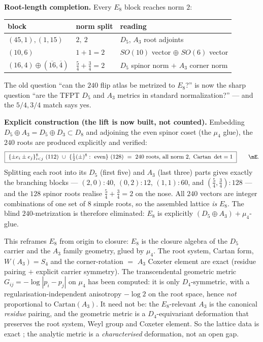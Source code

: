 \noindent\textbf{Root-length completion.} Every $E_8$ block reaches norm $2$:
\begin{center}\small
\begin{tabularx}{\linewidth}{@{}llY@{}}
\toprule
block & norm split & reading \\
\midrule
$(45,1),(1,15)$ & $2,\ 2$ & $D_5$, $A_3$ root adjoints \\
$(10,6)$ & $1+1=2$ & $SO(10)$ vector $\oplus$ $SO(6)$ vector \\
$(16,4)\oplus(\overline{16},\overline4)$ & $\tfrac54+\tfrac34=2$ & $D_5$ spinor norm $+$ $A_3$ corner norm \\
\bottomrule
\end{tabularx}
\end{center}
The old question ``can the $240$ flip atlas be metrized to $E_8$?'' is now the sharp question ``are
the TFPT $D_5$ and $A_3$ metrics in standard normalization?'' --- and the $5/4,3/4$ match says yes.

\noindent\textbf{Explicit construction (the lift is now built, not counted).} Embedding
$D_5\oplus A_3=D_5\oplus D_3\subset D_8$ and adjoining the even spinor coset (the $\mu_4$ glue), the
$240$ roots are produced explicitly and verified:
\begin{equation}
  \boxed{\ \{\pm e_i\pm e_j\}_{i<j}^{8}\ (112)\ \cup\ \{\tfrac12(\pm)^8:\ \text{even}\}\ (128)
  \ =\ 240\ \text{roots, all norm }2,\ \text{Cartan }\det=1\ }\qquad\mE .
\end{equation}
Splitting each root into its $D_5$ (first five) and $A_3$ (last three) parts gives exactly the
branching blocks --- $(2,0)\!:\!40$, $(0,2)\!:\!12$, $(1,1)\!:\!60$, and $(\tfrac54,\tfrac34)\!:\!128$ ---
and the $128$ spinor roots realise $\tfrac54+\tfrac34=2$ on the nose. All $240$ vectors are integer
combinations of one set of $8$ simple roots, so the assembled lattice \emph{is} $E_8$. The blind
$240$-metrization is therefore eliminated: $E_8$ is explicitly $(D_5\oplus A_3)+\mu_4$-glue.
\begin{remark}
This reframes $E_8$ from origin to closure: $E_8$ is the closure algebra of the $D_5$ carrier and the
$A_3$ family geometry, glued by $\mu_4$. The root system, Cartan form, $W(A_3)=S_4$ and the
corner-rotation $=$ $A_3$ Coxeter element are exact (residue pairing $+$ explicit carrier symmetry).
The transcendental geometric metric $G_{ij}=-\log|p_i-p_j|$ on $\mu_4$ has been computed: it is only
$D_4$-symmetric, with a regularisation-independent anisotropy $-\log2$ on the root space, hence
\emph{not} proportional to $\mathrm{Cartan}(A_3)$. It need not be: the $E_8$-relevant $A_3$ is the
canonical \emph{residue} pairing, and the geometric metric is a $D_4$-equivariant deformation that
preserves the root system, Weyl group and Coxeter element. So the lattice data is exact \mE; the
analytic metric is a \emph{characterised} deformation, not an open gap.
\end{remark}


